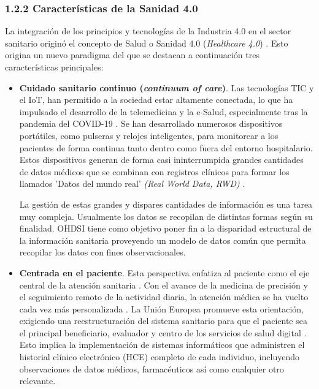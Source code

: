 \subsubsection{1.2.2 Características de la Sanidad 4.0}

La integración de los principios y tecnologías de la Industria 4.0 en el sector sanitario originó el concepto de Salud o Sanidad 4.0 (\textit{Healthcare 4.0}) \cite{tortorella2020healthcare, tortorella2021impacts}. 
Esto origina un nuevo paradigma del que se destacan a continuación tres características principales: %

\begin{itemize}

\item \textbf{Cuidado sanitario continuo (\textit{continuum of care})}. Las tecnologías TIC y el IoT, han permitido a la sociedad estar altamente conectada, lo que ha impulsado el desarrollo de la telemedicina y la e-Salud, especialmente tras la pandemia del COVID-19 \cite{martin2021ehealth}. Se han desarrollado numerosos dispositivos portátiles, como pulseras y relojes inteligentes, para monitorear a los pacientes de forma continua tanto dentro como fuera del entorno hospitalario. Estos dispositivos generan de forma casi ininterrumpida grandes cantidades de datos médicos que se combinan con registros clínicos para formar los llamados 'Datos del mundo real' \textit{(Real World Data, RWD)} \cite{kouroubali2019new}. 

La gestión de estas grandes y dispares cantidades de información es una tarea muy compleja. Usualmente los datos se recopilan de distintas formas según su finalidad. OHDSI tiene como objetivo poner fin a la disparidad estructural de la información sanitaria proveyendo un modelo de datos común que permita recopilar los datos con fines observacionales.

\item \textbf{Centrada en el paciente}. Esta perspectiva enfatiza al paciente como el eje central de la atención sanitaria \cite{tortorella2020healthcare}. Con el avance de la medicina de precisión y el seguimiento remoto de la actividad diaria, la atención médica se ha vuelto cada vez más personalizada \cite{ruiz2023inteligencia}. La Unión Europea promueve esta orientación, exigiendo una reestructuración del sistema sanitario para que el paciente sea el principal beneficiario, evaluador y centro de los servicios de salud digital \cite{ntafi2022legal, katehakis2019framework}. Esto implica la implementación de sistemas informáticos que administren el historial clínico electrónico (HCE) completo de cada individuo, incluyendo observaciones de datos médicos, farmacéuticos así como cualquier otro relevante.


\end{itemize}
